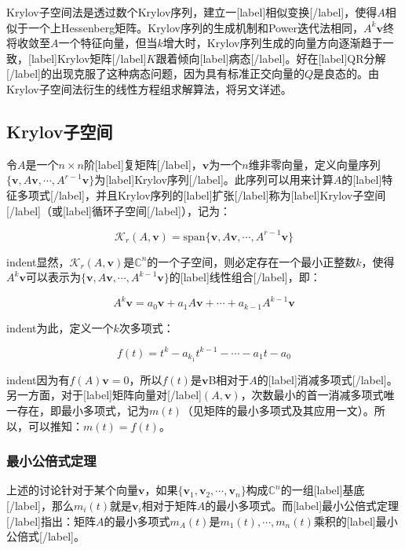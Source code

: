 \documentclass[UTF8,nofonts]{ctexart}
\begin{document}

Krylov子空间法是透过数个Krylov序列，建立一[label]相似变换[/label]，使得$A$相似于一个上Hessenberg矩阵。Krylov序列的生成机制和Power迭代法相同，$A^k\boldsymbol{v}$终将收敛至$A$一个特征向量，但当$k$增大时，Krylov序列生成的向量方向逐渐趋于一致，[label]Krylov矩阵[/label]$K$跟着倾向[label]病态[/label]。好在[label]QR分解[/label]的出现克服了这种病态问题，因为具有标准正交向量的$Q$是良态的。由Krylov子空间法衍生的线性方程组求解算法，将另文详述。

\subsection*{Krylov子空间}

令$A$是一个$n \times n$阶[label]复矩阵[/label]，$\boldsymbol{v}$为一个$n$维非零向量，定义向量序列$\{\boldsymbol{v},A\boldsymbol{v},\cdots,A^{r-1}\boldsymbol{v}\}$为[label]Krylov序列[/label]。此序列可以用来计算$A$的[label]特征多项式[/label]，并且Krylov序列的[label]扩张[/label]称为[label]Krylov子空间[/label]（或[label]循环子空间[/label]），记为：

\[
\mathcal{K}_r(A,\boldsymbol{v})=\text{span}\{\boldsymbol{v},A\boldsymbol{v},\cdots,A^{r-1}\boldsymbol{v}\}
\]

indent显然，$\mathcal{K}_r(A,\boldsymbol{v})$是$\mathbb{C}^n$的一个子空间，则必定存在一个最小正整数$k$，使得$A^k\boldsymbol{v}$可以表示为$\{\boldsymbol{v},A\boldsymbol{v},\cdots,A^{k-1}\boldsymbol{v}\}$的[label]线性组合[/label]，即：

\[
A^k\boldsymbol{v}=a_0\boldsymbol{v}+a_1A\boldsymbol{v}+\cdots+a_{k-1}A^{k-1}\boldsymbol{v}
\]

indent为此，定义一个$k$次多项式：

\[
f(t)=t^k-a_{k_1}t^{k-1}-\cdots-a_1t-a_0
\]

indent因为有$f(A)\boldsymbol{v}=0$，所以$f(t)$是$\boldsymbol{v}$B相对于$A$的[label]消减多项式[/label]。另一方面，对于[label]矩阵向量对[/label]$(A,\boldsymbol{v})$，次数最小的首一消减多项式唯一存在，即最小多项式，记为$m(t)$（见矩阵的最小多项式及其应用一文）。所以，可以推知：$m(t)=f(t)$。

\subsubsection*{最小公倍式定理}

上述的讨论针对于某个向量$\boldsymbol{v}$，如果$\{\boldsymbol{v}_1,\boldsymbol{v}_2,\cdots,\boldsymbol{v}_n\}$构成$\mathbb{C}^n$的一组[label]基底[/label]，那么$m_i(t)$就是$\boldsymbol{v}_i$相对于矩阵$A$的最小多项式。而[label]最小公倍式定理[/label]指出：矩阵$A$的最小多项式$m_A(t)$是$m_1(t),\cdots,m_n(t)$乘积的[label]最小公倍式[/label]。
\end{document}
